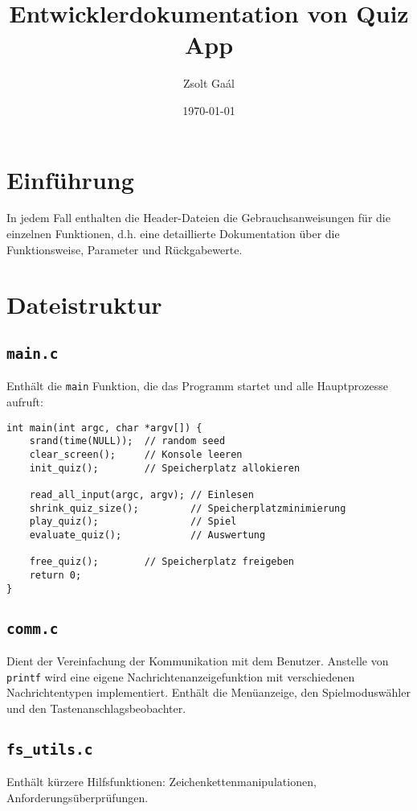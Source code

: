 \documentclass{article}
\title{Entwicklerdokumentation von Quiz App}
\author{Zsolt Gaál}
\date{\today}
\begin{document}
\maketitle

\tableofcontents

\newpage

\section{Einführung}
In jedem Fall enthalten die Header-Dateien die Gebrauchsanweisungen für die einzelnen Funktionen, d.h. eine detaillierte Dokumentation über die Funktionsweise, Parameter und Rückgabewerte.

\section{Dateistruktur}

\subsection{\texttt{main.c}}
Enthält die \texttt{main} Funktion, die das Programm startet und alle Hauptprozesse aufruft:

\begin{lstlisting}
int main(int argc, char *argv[]) {
    srand(time(NULL));  // random seed
    clear_screen();     // Konsole leeren
    init_quiz();        // Speicherplatz allokieren
    
    read_all_input(argc, argv); // Einlesen
    shrink_quiz_size();         // Speicherplatzminimierung
    play_quiz();                // Spiel
    evaluate_quiz();            // Auswertung

    free_quiz();        // Speicherplatz freigeben
    return 0;
}
\end{lstlisting}

\subsection{\texttt{comm.c}}
Dient der Vereinfachung der Kommunikation mit dem Benutzer. Anstelle von \texttt{printf} wird eine eigene Nachrichtenanzeigefunktion mit verschiedenen Nachrichtentypen implementiert. Enthält die Menüanzeige, den Spielmoduswähler und den Tastenanschlagsbeobachter.

\subsection{\texttt{fs\_utils.c}}
Enthält kürzere Hilfsfunktionen: Zeichenkettenmanipulationen, Anforderungsüberprüfungen.
\end{document}
